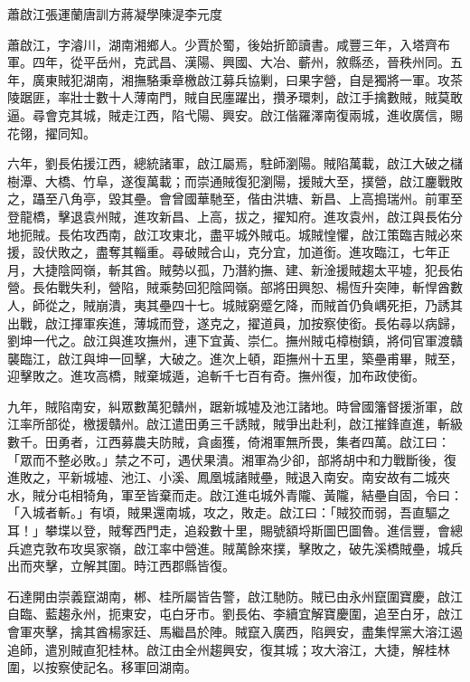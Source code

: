 
\begin{pinyinscope}
蕭啟江張運蘭唐訓方蔣凝學陳湜李元度

蕭啟江，字濬川，湖南湘鄉人。少賈於蜀，後始折節讀書。咸豐三年，入塔齊布軍。四年，從平岳州，克武昌、漢陽、興國、大冶、蘄州，敘縣丞，晉秩州同。五年，廣東賊犯湖南，湘撫駱秉章檄啟江募兵協剿，曰果字營，自是獨將一軍。攻茶陵踞匪，率壯士數十人薄南門，賊自民廛躍出，攢矛環刺，啟江手擒數賊，賊莫敢逼。尋會克其城，賊走江西，陷弋陽、興安。啟江偕羅澤南復兩城，進收廣信，賜花翎，擢同知。

六年，劉長佑援江西，總統諸軍，啟江屬焉，駐師瀏陽。賊陷萬載，啟江大破之櫧樹潭、大橋、竹阜，遂復萬載；而崇通賊復犯瀏陽，援賊大至，撲營，啟江鏖戰敗之，躡至八角亭，毀其壘。會曾國華馳至，偕由洪塘、新昌、上高搗瑞州。前軍至登龍橋，擊退袁州賊，進攻新昌、上高，拔之，擢知府。進攻袁州，啟江與長佑分地扼賊。長佑攻西南，啟江攻東北，盡平城外賊屯。城賊惶懼，啟江策臨吉賊必來援，設伏敗之，盡奪其輜重。尋破賊合山，克分宜，加道銜。進攻臨江，七年正月，大捷陰岡嶺，斬其酋。賊勢以孤，乃潛約撫、建、新淦援賊趨太平墟，犯長佑營。長佑戰失利，營陷，賊乘勢回犯陰岡嶺。部將田興恕、楊恆升突陣，斬悍酋數人，師從之，賊崩潰，夷其壘四十七。城賊窮蹙乞降，而賊首仍負嵎死拒，乃誘其出戰，啟江揮軍疾進，薄城而登，遂克之，擢道員，加按察使銜。長佑尋以病歸，劉坤一代之。啟江與進攻撫州，連下宜黃、崇仁。撫州賊屯樟樹鎮，將伺官軍渡贛襲臨江，啟江與坤一回擊，大破之。進次上頓，距撫州十五里，築壘甫畢，賊至，迎擊敗之。進攻高橋，賊棄城遁，追斬千七百有奇。撫州復，加布政使銜。

九年，賊陷南安，糾眾數萬犯贛州，踞新城墟及池江諸地。時曾國籓督援浙軍，啟江率所部從，檄援贛州。啟江遣田勇三千誘賊，賊爭出赴利，啟江摧鋒直進，斬級數千。田勇者，江西募農夫防賊，貪鹵獲，倚湘軍無所畏，集者四萬。啟江曰：「眾而不整必敗。」禁之不可，遇伏果潰。湘軍為少卻，部將胡中和力戰斷後，復進敗之，平新城墟、池江、小溪、鳳凰城諸賊壘，賊退入南安。南安故有二城夾水，賊分屯相犄角，軍至皆棄而走。啟江進屯城外青隴、黃隴，結壘自固，令曰：「入城者斬。」有頃，賊果還南城，攻之，敗走。啟江曰：「賊狡而弱，吾直驅之耳！」攀堞以登，賊奪西門走，追殺數十里，賜號額埒斯圖巴圖魯。進信豐，會總兵遮克敦布攻吳家嶺，啟江率中營進。賊萬餘來撲，擊敗之，破先溪橋賊壘，城兵出而夾擊，立解其圍。時江西郡縣皆復。

石達開由崇義竄湖南，郴、桂所屬皆告警，啟江馳防。賊已由永州竄圍寶慶，啟江自臨、藍趨永州，扼東安，屯白牙市。劉長佑、李續宜解寶慶圍，追至白牙，啟江會軍夾擊，擒其酋楊家廷、馬繼昌於陣。賊竄入廣西，陷興安，盡集悍黨大溶江遏追師，遣別賊直犯桂林。啟江由全州趨興安，復其城；攻大溶江，大捷，解桂林圍，以按察使記名。移軍回湖南。


\end{pinyinscope}
